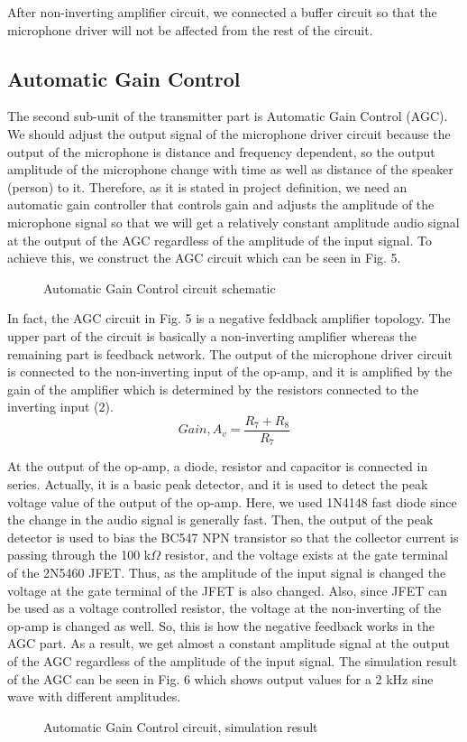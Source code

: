 \documentclass[conference]{IEEEtran}
\begin{document}
\par After non-inverting amplifier circuit, we connected a buffer circuit so that the microphone driver will not be affected from the rest of the circuit. 
\subsection{Automatic Gain Control}
The second sub-unit of the transmitter part is Automatic Gain Control (AGC). We should adjust the output signal of the microphone driver circuit because the output of the microphone is distance and frequency dependent, so the output amplitude of the microphone change with time as well as distance of the speaker (person) to it. Therefore, as it is stated in project definition, we need an automatic gain controller that controls gain and adjusts the amplitude of the microphone signal so that we will get a relatively constant amplitude audio signal at the output of the AGC regardless of the amplitude of the input signal. To achieve this, we construct the AGC circuit which can be seen in Fig. 5.
 \begin{figure}[H]
   \centerline{}
    \caption{Automatic Gain Control circuit schematic}
\end{figure}
\par In fact, the AGC circuit in Fig. 5 is a negative feddback amplifier topology. The upper part of the circuit is basically a non-inverting amplifier whereas the remaining part is feedback network. The output of the microphone driver circuit is connected to the non-inverting input of the op-amp, and it is amplified by the gain of the amplifier which is determined by the resistors connected to the inverting input (2). 
\begin{equation}\label{eq:2}
        Gain, A_v = \frac{R_7+R_8}{R_7} 
 \end{equation}
\par At the output of the op-amp, a diode, resistor and capacitor is connected in series. Actually, it is a basic peak detector, and it is used to detect the peak voltage value of the output of the op-amp. Here, we used 1N4148 fast diode \cite{1N4148} since the change in the audio signal is generally fast. Then, the output of the peak detector is used to bias the BC547 NPN transistor so that the collector current is passing through the 100 k\(\Omega\) resistor, and the voltage exists at the gate terminal of the 2N5460 JFET. Thus, as the amplitude of the input signal is changed the voltage at the gate terminal of the JFET is also changed. Also, since JFET can be used as a voltage controlled resistor, the voltage at the non-inverting of the op-amp is changed as well. So, this is how the negative feedback works in the AGC part. As a result, we get almost a constant amplitude signal at the output of the AGC regardless of the amplitude of the input signal. The simulation result of the AGC can be seen in Fig. 6 which shows output values for a 2 kHz sine wave with different amplitudes.
 \begin{figure}[H]
   \centerline{}
    \caption{Automatic Gain Control circuit, simulation result}
\end{figure}
\end{document}
